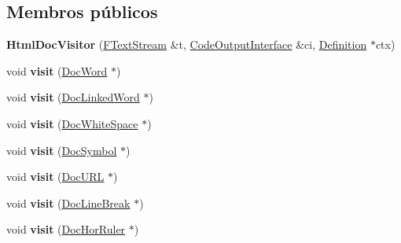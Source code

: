 \subsection*{Membros públicos}
\begin{DoxyCompactItemize}
\item 
\hypertarget{class_html_doc_visitor_ab41798ee9a0dbf6babb4bfcf344a8f5f}{{\bfseries Html\-Doc\-Visitor} (\hyperlink{class_f_text_stream}{F\-Text\-Stream} \&t, \hyperlink{class_code_output_interface}{Code\-Output\-Interface} \&ci, \hyperlink{class_definition}{Definition} $\ast$ctx)}\label{class_html_doc_visitor_ab41798ee9a0dbf6babb4bfcf344a8f5f}

\item 
\hypertarget{class_html_doc_visitor_ac60f6c2f041b955124e3ba6b63111ca5}{void {\bfseries visit} (\hyperlink{class_doc_word}{Doc\-Word} $\ast$)}\label{class_html_doc_visitor_ac60f6c2f041b955124e3ba6b63111ca5}

\item 
\hypertarget{class_html_doc_visitor_ab957281f81eaa9db582ac66f014ef342}{void {\bfseries visit} (\hyperlink{class_doc_linked_word}{Doc\-Linked\-Word} $\ast$)}\label{class_html_doc_visitor_ab957281f81eaa9db582ac66f014ef342}

\item 
\hypertarget{class_html_doc_visitor_a8e427da6441fcfec76f860101da1b132}{void {\bfseries visit} (\hyperlink{class_doc_white_space}{Doc\-White\-Space} $\ast$)}\label{class_html_doc_visitor_a8e427da6441fcfec76f860101da1b132}

\item 
\hypertarget{class_html_doc_visitor_aba7904fef0b15b1ff249f41815d3b739}{void {\bfseries visit} (\hyperlink{class_doc_symbol}{Doc\-Symbol} $\ast$)}\label{class_html_doc_visitor_aba7904fef0b15b1ff249f41815d3b739}

\item 
\hypertarget{class_html_doc_visitor_a38b6defe4c1e4aa2fb6bbc944f58f93c}{void {\bfseries visit} (\hyperlink{class_doc_u_r_l}{Doc\-U\-R\-L} $\ast$)}\label{class_html_doc_visitor_a38b6defe4c1e4aa2fb6bbc944f58f93c}

\item 
\hypertarget{class_html_doc_visitor_a1719b7dfc3a83b7976ff5997f56cd474}{void {\bfseries visit} (\hyperlink{class_doc_line_break}{Doc\-Line\-Break} $\ast$)}\label{class_html_doc_visitor_a1719b7dfc3a83b7976ff5997f56cd474}

\item 
\hypertarget{class_html_doc_visitor_aeed3d42f5e96c4016fbc6ab678f5549a}{void {\bfseries visit} (\hyperlink{class_doc_hor_ruler}{Doc\-Hor\-Ruler} $\ast$)}\label{class_html_doc_visitor_aeed3d42f5e96c4016fbc6ab678f5549a}


\end{DoxyCompactItemize}
